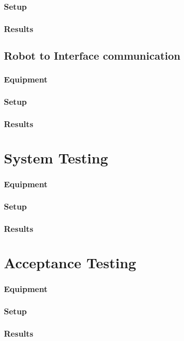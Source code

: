 \subsubsection{Setup}
 
\subsubsection{Results}
 
\subsection{Robot to Interface communication}

\subsubsection{Equipment}

\subsubsection{Setup}
 
\subsubsection{Results}
 
\section{System Testing}
 
\subsubsection{Equipment}

\subsubsection{Setup}

\subsubsection{Results}
 
\section{Acceptance Testing}
 
\subsubsection{Equipment}
 
\subsubsection{Setup}
 
\subsubsection{Results}
 




